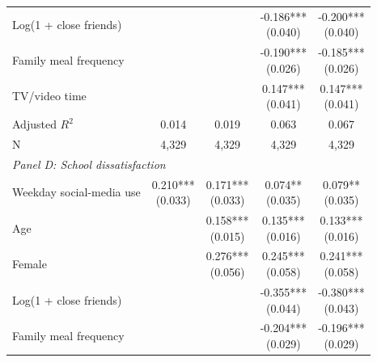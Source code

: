 \begin{table}[!htbp]
\begin{tabular}{lcccc}
\\
Log(1 + close friends) &  &  & \shortstack[c]{-0.186*** \\[-0.35ex] (0.040)} & \shortstack[c]{-0.200*** \\[-0.35ex] (0.040)}
\\
Family meal frequency &  &  & \shortstack[c]{-0.190*** \\[-0.35ex] (0.026)} & \shortstack[c]{-0.185*** \\[-0.35ex] (0.026)}
\\
TV/video time &  &  & \shortstack[c]{0.147*** \\[-0.35ex] (0.041)} & \shortstack[c]{0.147*** \\[-0.35ex] (0.041)}
\\
\hline
Adjusted $R^2$ & 0.014 & 0.019 & 0.063 & 0.067
\\
N & 4,329 & 4,329 & 4,329 & 4,329
\\
\hline
\multicolumn{5}{l}{\textit{Panel D: School dissatisfaction}} \\
\hline
Weekday social-media use & \shortstack[c]{0.210*** \\[-0.35ex] (0.033)} & \shortstack[c]{0.171*** \\[-0.35ex] (0.033)} & \shortstack[c]{0.074** \\[-0.35ex] (0.035)} & \shortstack[c]{0.079** \\[-0.35ex] (0.035)}
\\
Age &  & \shortstack[c]{0.158*** \\[-0.35ex] (0.015)} & \shortstack[c]{0.135*** \\[-0.35ex] (0.016)} & \shortstack[c]{0.133*** \\[-0.35ex] (0.016)}
\\
Female &  & \shortstack[c]{0.276*** \\[-0.35ex] (0.056)} & \shortstack[c]{0.245*** \\[-0.35ex] (0.058)} & \shortstack[c]{0.241*** \\[-0.35ex] (0.058)}
\\
Log(1 + close friends) &  &  & \shortstack[c]{-0.355*** \\[-0.35ex] (0.044)} & \shortstack[c]{-0.380*** \\[-0.35ex] (0.043)}
\\
Family meal frequency &  &  & \shortstack[c]{-0.204*** \\[-0.35ex] (0.029)} & \shortstack[c]{-0.196*** \\[-0.35ex] (0.029)}
\\

\end{tabular}
\end{table}
